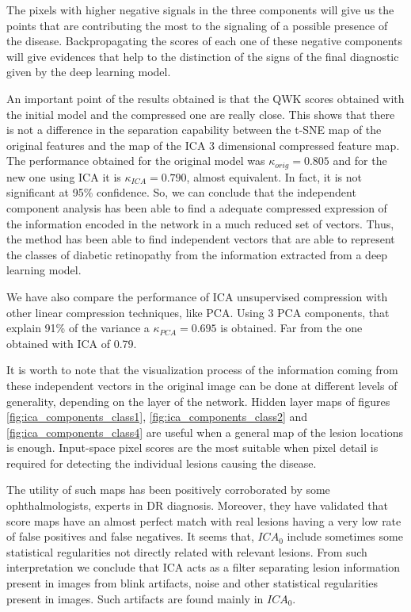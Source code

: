 \documentclass[review]{elsarticle}
\theoremstyle{definition} %
\theoremstyle{remark}
\begin{document}
The pixels with higher negative signals in the three components will give us the points that are contributing the most to the signaling of a possible presence of the disease. Backpropagating the scores of each one of these negative components will give evidences that help to the distinction of the signs of the final diagnostic given by the deep learning model.

An important point of the results obtained is that the QWK scores obtained with the initial model and the compressed one are really close. This shows that there is not a difference in the separation capability between the t-SNE map of the original features and the map of the ICA 3 dimensional compressed feature map. The performance obtained for the original model was $\kappa_{orig} = 0.805$ and for the new one using ICA it is $\kappa_{ICA} = 0.790$, almost equivalent. In fact, it is not significant at 95\% confidence. So, we can conclude that the independent component analysis has been able to find a adequate compressed expression of the information encoded in the network in a much reduced set of vectors.
Thus, the method has been able to find independent vectors that are able to represent the classes of diabetic retinopathy from the information extracted from a deep learning model.

We have also compare the performance of ICA unsupervised compression with other linear compression techniques, like PCA. Using 3 PCA components, that explain 91\% of the variance a $\kappa_{PCA} = 0.695$ is obtained. Far from the one obtained with ICA of 0.79.

It is worth to note that the visualization process of the information coming from these independent vectors in the original image can be done at different levels of generality, depending on the layer of the network. Hidden layer maps of figures \ref{fig:ica_components_class1}, \ref{fig:ica_components_class2} and \ref{fig:ica_components_class4} are useful when a general map of the lesion locations is enough. Input-space pixel scores are the most suitable when pixel detail is required for detecting the individual lesions causing the disease.

The utility of such maps has been positively corroborated by some ophthalmologists, experts in DR diagnosis. Moreover, they have validated that score maps have an almost perfect match with real lesions having a very low rate of false positives and false negatives. It seems that, $ICA_0$ include sometimes some statistical regularities not directly related with relevant lesions. From such interpretation we conclude that ICA acts as a filter separating lesion information present in images from blink artifacts, noise and other statistical regularities present in images. Such artifacts are found mainly in $ICA_0$.
\end{document}
